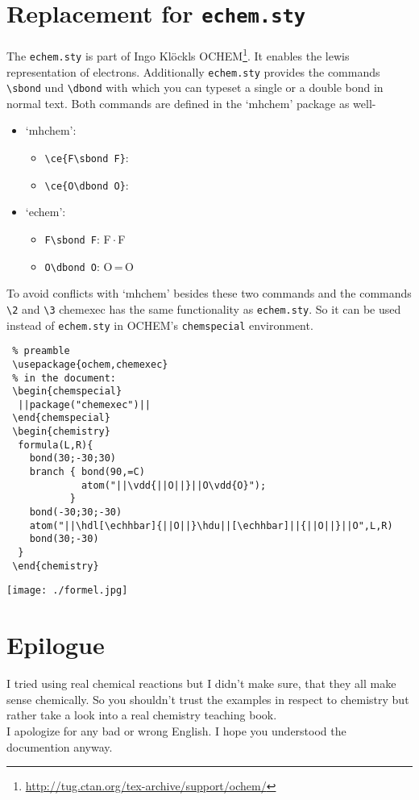 \documentclass[DIV10]{scrartcl}
\newcommand{\CEx}[1][8]{%
{\color{dunkelrot}\fontfamily{pag}\fontsize{#1}{#1}\selectfont chemexec}\xspace
}
\begin{document}
\section{Replacement for \texttt{echem.sty}}
The \verb=echem.sty= is part of Ingo Kl\"ockls OCHEM\footnote{\url{http://tug.ctan.org/tex-archive/support/ochem/}}. It enables the lewis representation of electrons. Additionally \verb=echem.sty= provides the commands \verb=\sbond= und \verb=\dbond= with which you can typeset a single or a double bond in normal text. Both commands are defined in the `mhchem' package as well-
\begin{itemize}
 \item `mhchem':
 \begin{itemize}
  \item\texttt{\textbackslash ce\{F\textbackslash sbond F\}}: 
  \item\texttt{\textbackslash ce\{O\textbackslash dbond O\}}: 
 \end{itemize}
 \item\newcommand{\sibond}{\,\ensuremath{\cdot}\,}\newcommand{\dobond}{\,=\,} `echem':
 \begin{itemize}
  \item\texttt{F\textbackslash sbond F}: F\sibond F
  \item\texttt{O\textbackslash dbond O}: O\dobond O
 \end{itemize}
\end{itemize}
To avoid conflicts with `mhchem' besides these two commands and the commands \verb=\2= and \verb=\3= \CEx has the same functionality as \verb=echem.sty=. So it can be used instead of \verb=echem.sty= in OCHEM's \verb=chemspecial= environment.
\begin{lstlisting}
 % preamble
 \usepackage{ochem,chemexec}
 % in the document:
 \begin{chemspecial}
  ||package("chemexec")||
 \end{chemspecial}
 \begin{chemistry}
  formula(L,R){
    bond(30;-30;30)
    branch { bond(90,=C)
             atom("||\vdd{||O||}||O\vdd{O}");
           }
    bond(-30;30;-30)
    atom("||\hdl[\echhbar]{||O||}\hdu||[\echhbar]||{||O||}||O",L,R)
    bond(30;-30)
  }
 \end{chemistry}
\end{lstlisting}
\texttt{[image: ./formel.jpg]}%

\section{Epilogue}
I tried using real chemical reactions but I didn't make sure, that they all make sense chemically. So you shouldn't trust the examples in respect to chemistry but rather take a look into a real chemistry teaching book.\\
I apologize for any bad or wrong English. I hope you understood the documention anyway.
\end{document}
